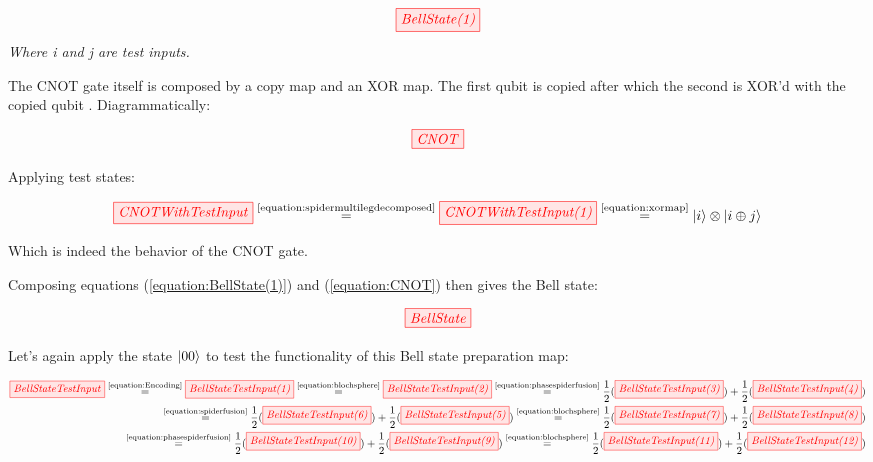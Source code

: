 \documentclass[]{article}
\newcommand{\equaltext}[1]{\ensuremath{\stackrel{\text{#1}}{=}}}
\begin{document}
\begin{equation}
	\label{equation:BellState(1)}
	\tikzfig{BellState(1)}
\end{equation}
\textit{Where i and j are test inputs.}

The CNOT gate itself is composed by a copy map and an XOR map. The first qubit is copied after which the second is XOR'd with the copied qubit \cite{articleCNOT}. Diagrammatically:

\begin{equation}
	\label{equation:CNOT}
	\tikzfig{CNOT}
\end{equation}

Applying test states:

\begin{equation}
	\tikzfig{CNOTWithTestInput} \equaltext{\ref{equation:spidermultilegdecomposed}} \tikzfig{CNOTWithTestInput(1)} \equaltext{\ref{equation:xormap}} \ket{i} \otimes \ket{i \oplus j}
\end{equation}

Which is indeed the behavior of the CNOT gate.

Composing equations (\ref{equation:BellState(1)}) and (\ref{equation:CNOT}) then gives the Bell state:

\begin{equation}
	\tikzfig{BellState}
\end{equation}

Let's again apply the state $\ket{00}$ to test the functionality of this Bell state preparation map:

\begin{equation}
\label{BellStateTestInput}
	\begin{split}
	\tikzfig{BellStateTestInput} \equaltext{\ref{equation:Encoding}} \tikzfig{BellStateTestInput(1)} \equaltext{\ref{equation:blochsphere}} \tikzfig{BellStateTestInput(2)} \equaltext{\ref{equation:phasespiderfusion}}
	 \frac{1}{2}(\tikzfig{BellStateTestInput(3)})+
	\frac{1}{2}(\tikzfig{BellStateTestInput(4)}) 
 \\ \equaltext{\ref{equation:spiderfusion}}
 	\frac{1}{2}(\tikzfig{BellStateTestInput(6)}) +
  \frac{1}{2}(\tikzfig{BellStateTestInput(5)}) 
	\equaltext{\ref{equation:blochsphere}} \frac{1}{2}(\tikzfig{BellStateTestInput(7)}) + \frac{1}{2}(\tikzfig{BellStateTestInput(8)}) \\ \equaltext{\ref{equation:phasespiderfusion}}
	\frac{1}{2}(\tikzfig{BellStateTestInput(10)}) +
	 \frac{1}{2}(\tikzfig{BellStateTestInput(9)}) 
	 \equaltext{\ref{equation:blochsphere}} \frac{1}{2}(\tikzfig{BellStateTestInput(11)}) +
	\frac{1}{2}(\tikzfig{BellStateTestInput(12)})
	\end{split}
\end{equation}
\end{document}
